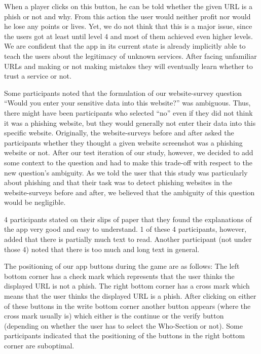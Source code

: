 \begin{description}[leftmargin=0cm]
When a player clicks on this button, he can be told whether the given URL is a phish or not and why.
From this action the user would neither profit nor would he lose any points or lives.
Yet, we do not think that this is a major issue, since the users got at least until level 4 and most of them achieved even higher levels.
We are confident that the app in its current state is already implicitly able to teach the users about the legitimacy of unknown services.
After facing unfamiliar URLs and making or not making mistakes they will eventually learn whether to trust a service or not.
	\item[Question to Data Entry:] Some participants noted that the formulation of our website-survey question ``Would you enter your sensitive data into this website?'' was ambiguous.
Thus, there might have been participants who selected ``no'' even if they did not think it was a phishing website, but they would generally not enter their data into this specific website.
Originally, the website-surveys before and after asked the participants whether they thought a given website screenshot was a phishing website or not.
After our test iteration of our study, however, we decided to add some context to the question and had to make this trade-off with respect to the new question's ambiguity.
As we told the user that this study was particularly about phishing and that their task was to detect phishing websites in the website-surveys before and after, we believed that the ambiguity of this question would be negligible.
	\item[Explanations and Comprehensibility:]
4 participants stated on their slips of paper that they found the explanations of the app very good and easy to understand.
1 of these 4 participants, however, added that there is partially much text to read.
Another participant (not under those 4) noted that there is too much and long text in general.
	\item[Button Positioning:] The positioning of our app buttons during the game are as follows: 
The left bottom corner has a check mark which represents that the user thinks the displayed URL is not a phish.
The right bottom corner has a cross mark which means that the user thinks the displayed URL is a phish.
After clicking on either of these buttons in the write bottom corner another button appears (where the cross mark usually is) which either is the continue or the verify button (depending on whether the user has to select the Who-Section or not).
Some participants indicated that the positioning of the buttons in the right bottom corner are suboptimal.

\end{description}
